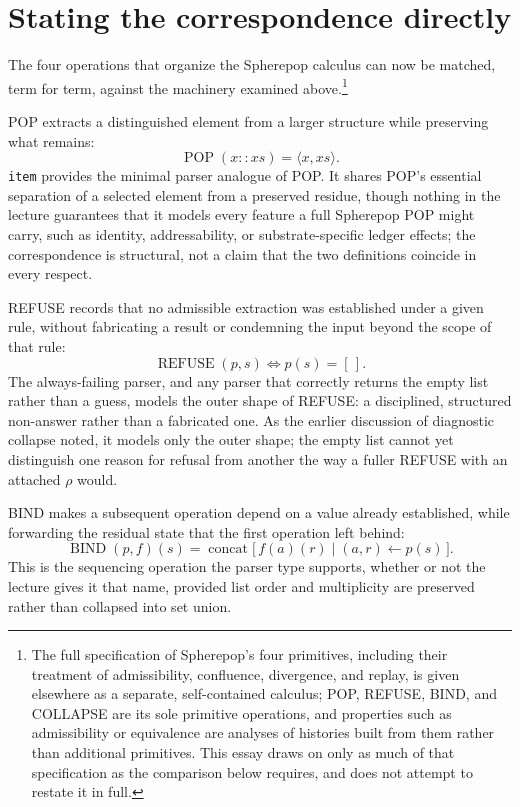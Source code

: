 \documentclass[11pt]{article}
\begin{document}
\section{Stating the correspondence directly}

The four operations that organize the Spherepop calculus can now be matched, term for term, against the machinery examined above.\footnote{The full specification of Spherepop's four primitives, including their treatment of admissibility, confluence, divergence, and replay, is given elsewhere as a separate, self-contained calculus; POP, REFUSE, BIND, and COLLAPSE are its sole primitive operations, and properties such as admissibility or equivalence are analyses of histories built from them rather than additional primitives. This essay draws on only as much of that specification as the comparison below requires, and does not attempt to restate it in full.}

POP extracts a distinguished element from a larger structure while preserving what remains:
\[
\operatorname{POP}(x :: xs) = \langle x, xs \rangle.
\]
\texttt{item} provides the minimal parser analogue of POP. It shares POP's essential separation of a selected element from a preserved residue, though nothing in the lecture guarantees that it models every feature a full Spherepop POP might carry, such as identity, addressability, or substrate-specific ledger effects; the correspondence is structural, not a claim that the two definitions coincide in every respect.

REFUSE records that no admissible extraction was established under a given rule, without fabricating a result or condemning the input beyond the scope of that rule:
\[
\operatorname{REFUSE}(p, s) \iff p(s) = [\,].
\]
The always-failing parser, and any parser that correctly returns the empty list rather than a guess, models the outer shape of REFUSE: a disciplined, structured non-answer rather than a fabricated one. As the earlier discussion of diagnostic collapse noted, it models only the outer shape; the empty list cannot yet distinguish one reason for refusal from another the way a fuller REFUSE with an attached $\rho$ would.

BIND makes a subsequent operation depend on a value already established, while forwarding the residual state that the first operation left behind:
\[
\operatorname{BIND}(p, f)(s) = \operatorname{concat}\bigl[\, f(a)(r) \mid (a,r) \leftarrow p(s) \,\bigr].
\]
This is the sequencing operation the parser type supports, whether or not the lecture gives it that name, provided list order and multiplicity are preserved rather than collapsed into set union.
\end{document}

